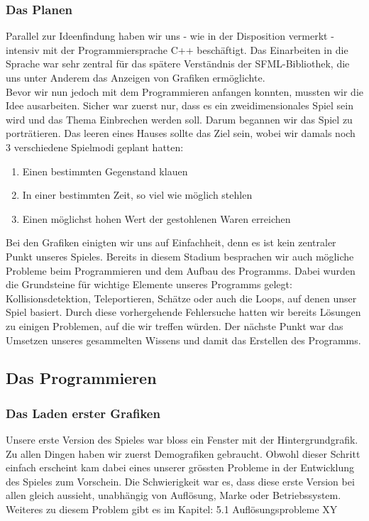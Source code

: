 \documentclass[12pt,a4paper]{scrartcl}
\begin{document}
\subsubsection{Das Planen}
Parallel zur Ideenfindung haben wir uns - wie in der
Disposition vermerkt - intensiv mit der Programmiersprache C++ beschäftigt. Das Einarbeiten
in die Sprache war sehr zentral für das spätere Verständnis der SFML-Bibliothek, die uns
unter Anderem das Anzeigen von Grafiken ermöglichte.
\\
Bevor wir nun jedoch mit dem Programmieren anfangen konnten, mussten wir die Idee ausarbeiten.
Sicher war zuerst nur, dass es ein zweidimensionales Spiel sein wird und das Thema Einbrechen werden soll.
Darum begannen wir das Spiel zu porträtieren. 
Das leeren eines Hauses sollte das Ziel sein, wobei wir damals noch 3 verschiedene Spielmodi geplant hatten:
\begin{enumerate}
\item Einen bestimmten Gegenstand klauen
\item In einer bestimmten Zeit, so viel wie möglich stehlen
\item Einen möglichst hohen Wert der gestohlenen Waren erreichen
\end{enumerate}
Bei den Grafiken einigten wir uns auf Einfachheit, denn es ist kein zentraler Punkt unseres Spieles.
Bereits in diesem Stadium besprachen wir auch mögliche Probleme beim Programmieren und dem Aufbau des Programms.
Dabei wurden die Grundsteine für wichtige Elemente unseres Programms gelegt: Kollisionsdetektion, Teleportieren, Schätze oder auch die Loops, auf denen unser Spiel basiert. 
Durch diese vorhergehende Fehlersuche hatten wir bereits Lösungen zu einigen Problemen, auf die wir treffen würden.
Der nächste Punkt war das Umsetzen unseres gesammelten Wissens und damit das Erstellen des Programms.

\newpage
\subsection{Das Programmieren}
\subsubsection{Das Laden erster Grafiken}
Unsere erste Version des Spieles war bloss ein Fenster mit der Hintergrundgrafik.
Zu allen Dingen haben wir zuerst Demografiken gebraucht.
Obwohl dieser Schritt einfach erscheint kam dabei eines unserer grössten Probleme in der Entwicklung des Spieles zum Vorschein.
Die Schwierigkeit war es, dass diese erste Version bei allen gleich aussieht, unabhängig von Auflösung, Marke oder Betriebssystem.
Weiteres zu diesem Problem gibt es im Kapitel: 5.1 Auflösungsprobleme XY
\end{document}
